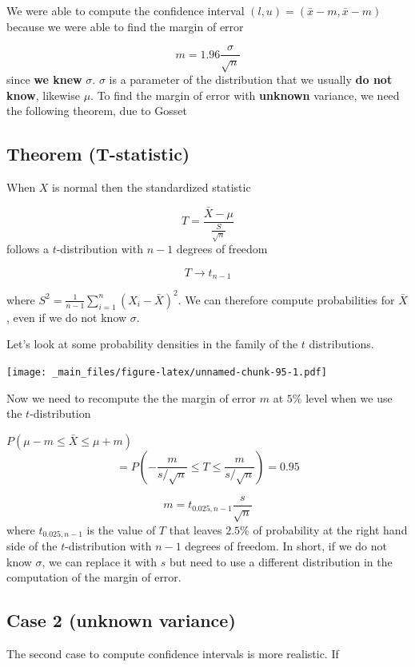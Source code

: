 \documentclass[
]{book}
\begin{document}
We were able to compute the confidence interval \((l,u)=(\bar{x} -m, \bar{x} -m)\) because we were able to find the margin of error

\[m=1.96 \frac{\sigma}{\sqrt{n}}\]
since \textbf{we knew} \(\sigma\). \(\sigma\) is a parameter of the distribution that we usually \textbf{do not know}, likewise \(\mu\). To find the margin of error with \textbf{unknown} variance, we need the following theorem, due to Gosset

\hypertarget{theorem-t-statistic}{%
\subsection{Theorem (T-statistic)}\label{theorem-t-statistic}}

When \(X\) is normal then the standardized statistic

\[T=\frac{\bar{X}-\mu}{\frac{S}{\sqrt{n}}}\]
follows a \(t\)-distribution with \(n-1\) degrees of freedom

\[T \rightarrow t_{n-1}\]

where \(S^2=\frac{1}{n-1} \sum_{i=1}^n (X_i-\bar{X})^2\). We can therefore compute probabilities for \(\bar{X}\), even if we do not know \(\sigma\).

Let's look at some probability densities in the family of the \(t\) distributions.

\texttt{[image: \_main\_files/figure-latex/unnamed-chunk-95-1.pdf]}

Now we need to recompute the the margin of error \(m\) at \(5\%\) level when we use the \(t\)-distribution

\(P(\mu-m \leq \bar{X} \leq\mu + m)\)
\[=P(-\frac{m}{s/\sqrt{n}} \leq T \leq\frac{m}{s/\sqrt{n}})=0.95\]

\[m=t_{0.025, n-1} \frac{s}{\sqrt{n}}\]
where \(t_{0.025, n-1}\) is the value of \(T\) that leaves \(2.5\%\) of probability at the right hand side of the \(t\)-distribution with \(n-1\) degrees of freedom. In short, if we do not know \(\sigma\), we can replace it with \(s\) but need to use a different distribution in the computation of the margin of error.

\hypertarget{case-2-unknown-variance}{%
\subsection{Case 2 (unknown variance)}\label{case-2-unknown-variance}}

The second case to compute confidence intervals is more realistic. If
\end{document}

